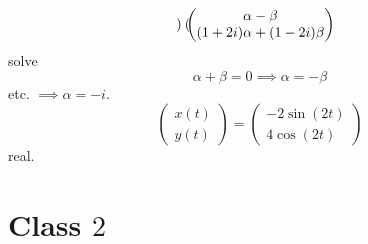 \documentclass[10pt, a4paper]{article}
\begin{document}
\begin{problem}
\begin{solution}
\begin{enumerate}[label = (\alph*)]
\[\begin{pmatrix}
            \end{pmatrix} \\
            \begin{pmatrix}
                \alpha - \beta \\
                (1 + 2i)\alpha + (1 - 2i)\beta
            \end{pmatrix}
            \]
            solve
            \[
            \alpha + \beta = 0 \implies \alpha = -\beta
            \]
            etc.
            $\implies \alpha = -i$.
            \[
            \begin{pmatrix}
                x(t) \\ y(t)
            \end{pmatrix} = \begin{pmatrix}
                -2\sin(2t) \\
                4\cos(2t)
            \end{pmatrix}
            \]
            real.
        \end{enumerate}
    \end{solution}
\end{problem}

\newpage

\section{Class \texorpdfstring{$2$}{}}
\end{document}
